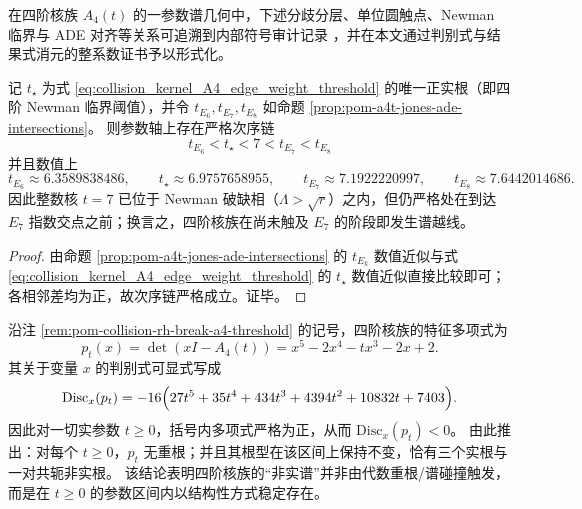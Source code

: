







在四阶核族 \(A_4(t)\) 的一参数谱几何中，下述分歧分层、单位圆触点、Newman 临界与 ADE 对齐等关系可追溯到内部符号审计记录 \cite{Internal2026POMA4TSpectralAudit20260217}，并在本文通过判别式与结果式消元的整系数证书予以形式化。

\begin{corollary}\label{cor:pom-a4t-newman-threshold-ade-ordering}
记 \(t_\star\) 为式 \eqref{eq:collision_kernel_A4_edge_weight_threshold} 的唯一正实根（即四阶 Newman 临界阈值），并令 \(t_{E_6},t_{E_7},t_{E_8}\) 如命题 \ref{prop:pom-a4t-jones-ade-intersections}。
则参数轴上存在严格次序链
\[
\boxed{\;t_{E_6}<t_\star<7<t_{E_7}<t_{E_8}\;}
\]
并且数值上
\[
t_{E_6}\approx 6.3589838486,\qquad
t_\star\approx 6.9757658955,\qquad
t_{E_7}\approx 7.1922220997,\qquad
t_{E_8}\approx 7.6442014686.
\]
因此整数核 \(t=7\) 已位于 Newman 破缺相（\(\Lambda>\sqrt r\)）之内，但仍严格处在到达 \(E_7\) 指数交点之前；换言之，四阶核族在尚未触及 \(E_7\) 的阶段即发生谱越线。
\end{corollary}
\begin{proof}
由命题 \ref{prop:pom-a4t-jones-ade-intersections} 的 \(t_{E_k}\) 数值近似与式 \eqref{eq:collision_kernel_A4_edge_weight_threshold} 的 \(t_\star\) 数值近似直接比较即可；各相邻差均为正，故次序链严格成立。证毕。
\end{proof}





\begin{remark}[四阶核族的判别式闭式与根型刚性]\label{rem:pom-a4t-discriminant-root-type}
沿注 \ref{rem:pom-collision-rh-break-a4-threshold} 的记号，四阶核族的特征多项式为
\[
p_t(x)=\det(xI-A_4(t))=x^5-2x^4-tx^3-2x+2.
\]
其关于变量 \(x\) 的判别式可显式写成
\[
\mathrm{Disc}_x(p_t)
=-16\Bigl(27t^5+35t^4+434t^3+4394t^2+10832t+7403\Bigr).
\]
因此对一切实参数 \(t\ge 0\)，括号内多项式严格为正，从而 \(\mathrm{Disc}_x(p_t)<0\)。
由此推出：对每个 \(t\ge 0\)，\(p_t\) 无重根；并且其根型在该区间上保持不变，恰有三个实根与一对共轭非实根。
该结论表明四阶核族的“非实谱”并非由代数重根/谱碰撞触发，而是在 \(t\ge 0\) 的参数区间内以结构性方式稳定存在。
\end{remark}

